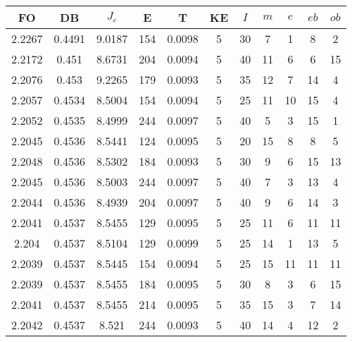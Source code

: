 \begin{table}[h!]
    \footnotesize
    \begin{center}
        \begin{tabular}{|c|c|c|c|c|c|c|c|c|c|c|}
        \hline
            {\bf FO} & {\bf DB} & $J_e$ & {\bf E} & {\bf T} & {\bf KE} & $I$ & $m$ & $e$ & $eb$ & $ob$ \\
        \hline
        \hline
            2.2267 & 0.4491  & 9.0187 & 154 & 0.0098 & 5 & 30 & 7 & 1 & 8 & 2\\
        \hline
        \hline
            2.2172 & 0.451  & 8.6731 & 204 & 0.0094 & 5 & 40 & 11 & 6 & 6 & 15\\
        \hline
        \hline
            2.2076 & 0.453  & 9.2265 & 179 & 0.0093 & 5 & 35 & 12 & 7 & 14 & 4\\
        \hline
        \hline
            2.2057 & 0.4534  & 8.5004 & 154 & 0.0094 & 5 & 25 & 11 & 10 & 15 & 4\\
        \hline
        \hline
            2.2052 & 0.4535  & 8.4999 & 244 & 0.0097 & 5 & 40 & 5 & 3 & 15 & 1\\
        \hline
        \hline
            2.2045 & 0.4536  & 8.5441 & 124 & 0.0095 & 5 & 20 & 15 & 8 & 8 & 5\\
        \hline
        \hline
            2.2048 & 0.4536  & 8.5302 & 184 & 0.0093 & 5 & 30 & 9 & 6 & 15 & 13\\
        \hline
        \hline
            2.2045 & 0.4536  & 8.5003 & 244 & 0.0097 & 5 & 40 & 7 & 3 & 13 & 4\\
        \hline
        \hline
            2.2044 & 0.4536  & 8.4939 & 204 & 0.0097 & 5 & 40 & 9 & 6 & 14 & 3\\
        \hline
        \hline
            2.2041 & 0.4537  & 8.5455 & 129 & 0.0095 & 5 & 25 & 11 & 6 & 11 & 11\\
        \hline
        \hline
            2.204 & 0.4537  & 8.5104 & 129 & 0.0099 & 5 & 25 & 14 & 1 & 13 & 5\\
        \hline
        \hline
            2.2039 & 0.4537  & 8.5445 & 154 & 0.0094 & 5 & 25 & 15 & 11 & 11 & 11\\
        \hline
        \hline
            2.2039 & 0.4537  & 8.5455 & 184 & 0.0095 & 5 & 30 & 8 & 3 & 6 & 15\\
        \hline
        \hline
            2.2041 & 0.4537  & 8.5455 & 214 & 0.0095 & 5 & 35 & 15 & 3 & 7 & 14\\
        \hline
        \hline
            2.2042 & 0.4537  & 8.521 & 244 & 0.0093 & 5 & 40 & 14 & 4 & 12 & 2\\

\end{tabular}
\end{center}
\end{table}
